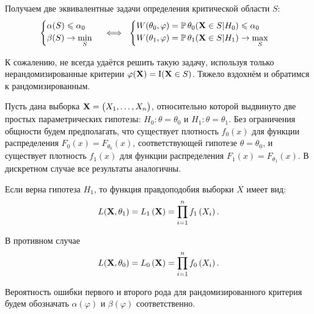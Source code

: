 Получаем две эквивалентные задачи определения критической области $S$:
\begin{equation*}
    \begin{cases}
        \alpha(S) \leqslant \alpha_{0} \\
        \beta(S) \to \min\limits_{S}
    \end{cases}
    \iff~
    \begin{cases}
        W(\theta_0, \varphi) = \operatorname{\mathbb{P}}{\theta_0} (\mathbf{X}\in S | H_0) \leqslant \alpha_0  \\
        W(\theta_1, \varphi) = \operatorname{\mathbb{P}}{\theta_1} (\mathbf{X}\in S | H_1) \to \max\limits_{S} 
    \end{cases}
\end{equation*}

К сожалению, не всегда удаётся решить такую задачу, используя только нерандомизированные критерии $\varphi(\mathbf{X}) = \operatorname{\mathrm{I}}(\mathbf{X}\in S)$.
Тяжело вздохнём и обратимся к рандомизированным.

Пусть дана выборка $\mathbf{X}= \bigl(X_1, \ldots, X_n \bigr)$, относительно которой выдвинуто две простых параметрических гипотезы: 
$H_0\colon \theta = \theta_0$ и $H_1\colon \theta = \theta_1$.
Без ограничения общности будем предполагать, что существует плотность $f_{0}(x)$ для функции распределения $F_{0}(x) = F_{\theta_0}(x)$, соответствующей гипотезе $\theta = \theta_0$, 
и существует плотность $f_{1}(x)$ для функции распределения $F_{1}(x) = F_{\theta_1}(x)$.
В дискретном случае все результаты аналогичны.

Если верна гипотеза $H_1$, то функция правдоподобия выборки $X$ имеет вид:
\begin{equation*}
    L(\mathbf{X}, \theta_1) =  L_{1}\left(\mathbf{X}\right) = \prod_{i=1}^{n} f_{1}\left(X_{i}\right).
\end{equation*}

В противном случае 
\begin{equation*}
    L(\mathbf{X}, \theta_0) = L_{0}\left(\mathbf{X}\right) = \prod_{i=1}^{n} f_{0}\left(X_{i}\right).
\end{equation*}

\begin{rmrk}
    Вероятность ошибки первого и второго рода для рандомизированного критерия будем обозначать
    $\alpha(\varphi)$ и $\beta(\varphi)$ соответственно.
\end{rmrk}

